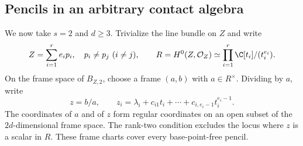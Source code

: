\subsection{Pencils in an arbitrary contact algebra}
We now take $s=2$ and $d\ge3$. Trivialize the line bundle on $Z$
and write
\[
 Z=\sum_{i=1}^r e_i p_i,\quad p_i\ne p_j\ (i\ne j),\qquad
 R=H^0(Z,\mathcal O_Z)
       \simeq\prod_{i=1}^r\C[t_i]/(t_i^{e_i}).
\]
On the frame space of $B_{Z,2}$, choose a frame $(a,b)$ with
$a\in R^\times$. Dividing by $a$, write
\begin{equation}\label{eq:residue-pencil-coordinates}
 z=b/a,\qquad
 z_i=\lambda_i+c_{i1}t_i+\cdots+c_{i,e_i-1}t_i^{e_i-1}.
\end{equation}
The coordinates of $a$ and of $z$ form regular coordinates on an
open subset of the $2d$-dimensional frame space. The rank-two
condition excludes the locus where $z$ is a scalar in $R$.
These frame charts cover every base-point-free pencil.

